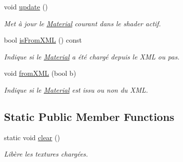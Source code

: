 \begin{DoxyCompactItemize}
void \hyperlink{class_material_a3f43fe7bcfa721fd8156adb151adf45c}{update} ()
\begin{DoxyCompactList}\small\item\em Met à jour le \hyperlink{class_material}{Material} courant dans le shader actif. \end{DoxyCompactList}\item 
bool \hyperlink{class_material_a3641da3931be722a809b13f882e2a703}{is\+From\+X\+M\+L} () const 
\begin{DoxyCompactList}\small\item\em Indique si le \hyperlink{class_material}{Material} a été chargé depuis le X\+M\+L ou pas. \end{DoxyCompactList}\item 
void \hyperlink{class_material_a806be90008bdccd18e0d657ac75ef61c}{from\+X\+M\+L} (bool b)
\begin{DoxyCompactList}\small\item\em Indique si le \hyperlink{class_material}{Material} est issu ou non du X\+M\+L. \end{DoxyCompactList}\end{DoxyCompactItemize}
\subsection*{Static Public Member Functions}
\begin{DoxyCompactItemize}
\item 
static void \hyperlink{class_material_ab350dd584b850dfc3e0c52201b5699e0}{clear} ()
\begin{DoxyCompactList}\small\item\em Libère les textures chargées. \end{DoxyCompactList}\end{DoxyCompactItemize}
